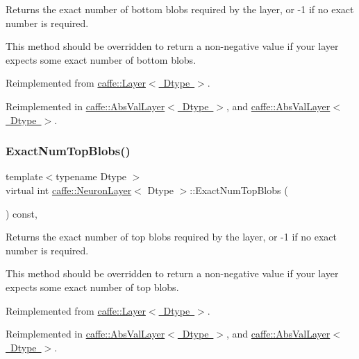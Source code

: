 Returns the exact number of bottom blobs required by the layer, or -\/1 if no exact number is required. 

This method should be overridden to return a non-\/negative value if your layer expects some exact number of bottom blobs. 

Reimplemented from \mbox{\hyperlink{classcaffe_1_1_layer_a8e5ee0494d85f5f55fc4396537cbc60f}{caffe\+::\+Layer$<$ Dtype $>$}}.



Reimplemented in \mbox{\hyperlink{classcaffe_1_1_abs_val_layer_acac806dbc6d3fa3dd7daae00caabd731}{caffe\+::\+Abs\+Val\+Layer$<$ Dtype $>$}}, and \mbox{\hyperlink{classcaffe_1_1_abs_val_layer_acac806dbc6d3fa3dd7daae00caabd731}{caffe\+::\+Abs\+Val\+Layer$<$ Dtype $>$}}.

\mbox{\label{classcaffe_1_1_neuron_layer_a47ac5e7208e4b14ad1e4040a621dbfbc}} 
\subsubsection{\texorpdfstring{Exact\+Num\+Top\+Blobs()}{ExactNumTopBlobs()}\hspace{0.1cm}{\footnotesize\ttfamily [1/2]}}
{\footnotesize\ttfamily template$<$typename Dtype $>$ \\
virtual int \mbox{\hyperlink{classcaffe_1_1_neuron_layer}{caffe\+::\+Neuron\+Layer}}$<$ Dtype $>$\+::Exact\+Num\+Top\+Blobs (\begin{DoxyParamCaption}{ }\end{DoxyParamCaption}) const\hspace{0.3cm}{\ttfamily [inline]}, {\ttfamily [virtual]}}



Returns the exact number of top blobs required by the layer, or -\/1 if no exact number is required. 

This method should be overridden to return a non-\/negative value if your layer expects some exact number of top blobs. 

Reimplemented from \mbox{\hyperlink{classcaffe_1_1_layer_a64e2ca72c719e4b2f1f9216ccfb0d37f}{caffe\+::\+Layer$<$ Dtype $>$}}.



Reimplemented in \mbox{\hyperlink{classcaffe_1_1_abs_val_layer_aaf18bf4b77994475e8b55e5cefaa654a}{caffe\+::\+Abs\+Val\+Layer$<$ Dtype $>$}}, and \mbox{\hyperlink{classcaffe_1_1_abs_val_layer_aaf18bf4b77994475e8b55e5cefaa654a}{caffe\+::\+Abs\+Val\+Layer$<$ Dtype $>$}}.

